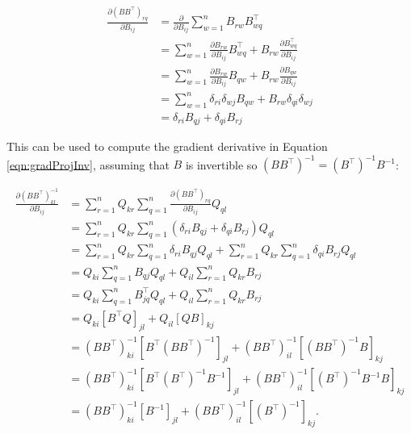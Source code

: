 \documentclass[12pt]{article}
\theoremstyle{definition}
\begin{document}
\begin{equation}
    \label{eqn:gradProjElement}
    \begin{split}
        \frac{\partial (BB^\top)_{rq}}{\partial B_{ij}} &= \frac{\partial}{\partial B_{ij}} \sum_{w=1}^{n} B_{rw}B_{wq}^\top \\ 
        &= \sum_{w=1}^{n} \frac{\partial B_{rw}}{\partial B_{ij}} B_{wq}^\top + B_{rw} \frac{\partial B_{wq}^\top}{\partial B_{ij}} \\
        & = \sum_{w=1}^{n} \frac{\partial B_{rw}}{\partial B_{ij}} B_{qw} + B_{rw} \frac{\partial B_{qw}}{\partial B_{ij}} \\ 
        & = \sum_{w=1}^{n} \delta_{ri} \delta_{wj} B_{qw} + B_{rw} \delta_{qi} \delta_{wj} \\ 
        & = \delta_{ri} B_{qj} + \delta_{qi} B_{rj}
    \end{split}
\end{equation}

This can be used to compute the gradient derivative in Equation \ref{eqn:gradProjInv}, assuming that $B$ is invertible so $(BB^\top)^{-1} = (B^\top)^{-1} B^{-1}$:

\begin{equation}
    \label{eqn:gradProjInvFinal}
    \begin{split}
        \frac{\partial (BB^\top)^{-1}_{kl}}{\partial B_{ij}} &= \sum_{r=1}^{n} Q_{kr} \sum_{q=1}^{n} \frac{\partial (BB^\top)_{rq}}{\partial B_{ij}} Q_{ql} \\ 
        & = \sum_{r=1}^{n} Q_{kr} \sum_{q=1}^{n} (\delta_{ri} B_{qj} + \delta_{qi} B_{rj}) Q_{ql} \\
        & = \sum_{r=1}^{n} Q_{kr} \sum_{q=1}^{n} \delta_{ri} B_{qj} Q_{ql} + \sum_{r=1}^{n} Q_{kr} \sum_{q=1}^{n} \delta_{qi} B_{rj} Q_{ql} \\ 
        & = Q_{ki} \sum_{q=1}^{n} B_{qj} Q_{ql} + Q_{il} \sum_{r=1}^{n} Q_{kr} B_{rj}  \\ 
        & = Q_{ki} \sum_{q=1}^{n} B^\top_{jq} Q_{ql} + Q_{il} \sum_{r=1}^{n} Q_{kr} B_{rj}  \\ 
        & = Q_{ki} [B^\top Q]_{jl} + Q_{il} [QB]_{kj} \\ 
        & = (BB^\top)^{-1}_{ki} [B^\top (BB^\top)^{-1}]_{jl} + (BB^\top)^{-1}_{il} [(BB^\top)^{-1} B]_{kj} \\ 
        & = (BB^\top)^{-1}_{ki} [B^\top (B^\top)^{-1} B^{-1}]_{jl} + (BB^\top)^{-1}_{il} [(B^\top)^{-1} B^{-1} B]_{kj} \\ 
        & = (BB^\top)^{-1}_{ki} [B^{-1}]_{jl} + (BB^\top)^{-1}_{il} [(B^\top)^{-1}]_{kj}.
    \end{split}
\end{equation}
\end{document}
